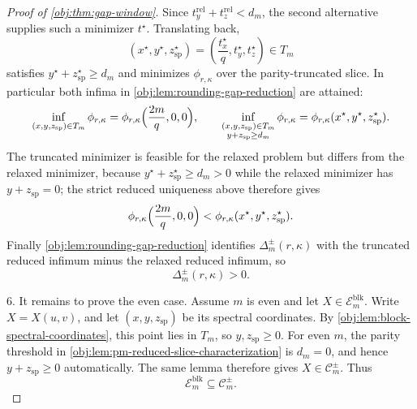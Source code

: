 \begin{proof}[Proof of \cref{obj:thm:gap-window}]
Since \(t^{\mathrm{rel}}_y+t^{\mathrm{rel}}_z<d_m\), the second alternative supplies such a minimizer \(t^\star\). Translating back,
\[
(x^\star,y^\star,z^\star_{\mathrm{sp}})
=
\left(\frac{t_x^\star}{q},t_y^\star,t_z^\star\right)
\in T_m
\]
satisfies \(y^\star+z^\star_{\mathrm{sp}}\ge d_m\) and minimizes \(\phi_{r,\kappa}\) over the parity-truncated slice.  In particular both infima in \cref{obj:lem:rounding-gap-reduction} are attained:
\[
\inf_{(x,y,z_{\mathrm{sp}})\in T_m}\phi_{r,\kappa}
=\phi_{r,\kappa}\Bigl(\frac{2m}{q},0,0\Bigr),
\qquad
\inf_{\substack{(x,y,z_{\mathrm{sp}})\in T_m\\ y+z_{\mathrm{sp}}\ge d_m}}\phi_{r,\kappa}
=\phi_{r,\kappa}(x^\star,y^\star,z^\star_{\mathrm{sp}}).
\]
The truncated minimizer is feasible for the relaxed problem but differs from the relaxed minimizer, because \(y^\star+z^\star_{\mathrm{sp}}\ge d_m>0\) while the relaxed minimizer has \(y+z_{\mathrm{sp}}=0\); the strict reduced uniqueness above therefore gives
\[
\phi_{r,\kappa}\Bigl(\frac{2m}{q},0,0\Bigr)<\phi_{r,\kappa}(x^\star,y^\star,z^\star_{\mathrm{sp}}).
\]
Finally \cref{obj:lem:rounding-gap-reduction} identifies \(\Delta_m^{\pm}(r,\kappa)\) with the truncated reduced infimum minus the relaxed reduced infimum, so
\[
\Delta_m^{\pm}(r,\kappa)>0.
\]  %

6.  It remains to prove the even case. Assume \(m\) is even and let \(X\in\mathcal E_m^{\mathrm{blk}}\). Write \(X=X(u,v)\), and let \((x,y,z_{\mathrm{sp}})\) be its spectral coordinates. By \cref{obj:lem:block-spectral-coordinates}, this point lies in \(T_m\), so \(y,z_{\mathrm{sp}}\ge0\). For even \(m\), the parity threshold in \cref{obj:lem:pm-reduced-slice-characterization} is \(d_m=0\), and hence \(y+z_{\mathrm{sp}}\ge0\) automatically. The same lemma therefore gives \(X\in\mathcal C_m^{\pm}\). Thus
\[
\mathcal E_m^{\mathrm{blk}}\subseteq\mathcal C_m^{\pm}.
\]  %
\end{proof}


